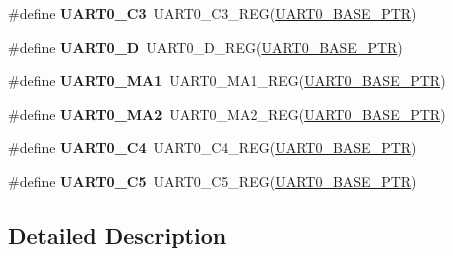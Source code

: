 \begin{DoxyCompactItemize}
\item 
\hypertarget{group___u_a_r_t0___register___accessor___macros_ga3c9f4285d3471fb4833ff6cf1131b438}{}\#define {\bfseries U\+A\+R\+T0\+\_\+\+C3}~U\+A\+R\+T0\+\_\+\+C3\+\_\+\+R\+E\+G(\hyperlink{group___u_a_r_t0___peripheral_ga50a02c91ffbd11fa7b4f0c33fe585199}{U\+A\+R\+T0\+\_\+\+B\+A\+S\+E\+\_\+\+P\+T\+R})\label{group___u_a_r_t0___register___accessor___macros_ga3c9f4285d3471fb4833ff6cf1131b438}

\item 
\hypertarget{group___u_a_r_t0___register___accessor___macros_ga2dea5280025ba01ef69f0fa6a6505cf1}{}\#define {\bfseries U\+A\+R\+T0\+\_\+\+D}~U\+A\+R\+T0\+\_\+\+D\+\_\+\+R\+E\+G(\hyperlink{group___u_a_r_t0___peripheral_ga50a02c91ffbd11fa7b4f0c33fe585199}{U\+A\+R\+T0\+\_\+\+B\+A\+S\+E\+\_\+\+P\+T\+R})\label{group___u_a_r_t0___register___accessor___macros_ga2dea5280025ba01ef69f0fa6a6505cf1}

\item 
\hypertarget{group___u_a_r_t0___register___accessor___macros_ga1ed5f65c9f9d7626053f21aa9f4a5b1f}{}\#define {\bfseries U\+A\+R\+T0\+\_\+\+M\+A1}~U\+A\+R\+T0\+\_\+\+M\+A1\+\_\+\+R\+E\+G(\hyperlink{group___u_a_r_t0___peripheral_ga50a02c91ffbd11fa7b4f0c33fe585199}{U\+A\+R\+T0\+\_\+\+B\+A\+S\+E\+\_\+\+P\+T\+R})\label{group___u_a_r_t0___register___accessor___macros_ga1ed5f65c9f9d7626053f21aa9f4a5b1f}

\item 
\hypertarget{group___u_a_r_t0___register___accessor___macros_gaa28e0bdbb01cd6891123e351772bcf41}{}\#define {\bfseries U\+A\+R\+T0\+\_\+\+M\+A2}~U\+A\+R\+T0\+\_\+\+M\+A2\+\_\+\+R\+E\+G(\hyperlink{group___u_a_r_t0___peripheral_ga50a02c91ffbd11fa7b4f0c33fe585199}{U\+A\+R\+T0\+\_\+\+B\+A\+S\+E\+\_\+\+P\+T\+R})\label{group___u_a_r_t0___register___accessor___macros_gaa28e0bdbb01cd6891123e351772bcf41}

\item 
\hypertarget{group___u_a_r_t0___register___accessor___macros_ga872dbf2a778697ea6e01a2d8a8b08869}{}\#define {\bfseries U\+A\+R\+T0\+\_\+\+C4}~U\+A\+R\+T0\+\_\+\+C4\+\_\+\+R\+E\+G(\hyperlink{group___u_a_r_t0___peripheral_ga50a02c91ffbd11fa7b4f0c33fe585199}{U\+A\+R\+T0\+\_\+\+B\+A\+S\+E\+\_\+\+P\+T\+R})\label{group___u_a_r_t0___register___accessor___macros_ga872dbf2a778697ea6e01a2d8a8b08869}

\item 
\hypertarget{group___u_a_r_t0___register___accessor___macros_ga68f548f83ee16efb6cdd0cd5c37ebed3}{}\#define {\bfseries U\+A\+R\+T0\+\_\+\+C5}~U\+A\+R\+T0\+\_\+\+C5\+\_\+\+R\+E\+G(\hyperlink{group___u_a_r_t0___peripheral_ga50a02c91ffbd11fa7b4f0c33fe585199}{U\+A\+R\+T0\+\_\+\+B\+A\+S\+E\+\_\+\+P\+T\+R})\label{group___u_a_r_t0___register___accessor___macros_ga68f548f83ee16efb6cdd0cd5c37ebed3}

\end{DoxyCompactItemize}


\subsection{Detailed Description}

